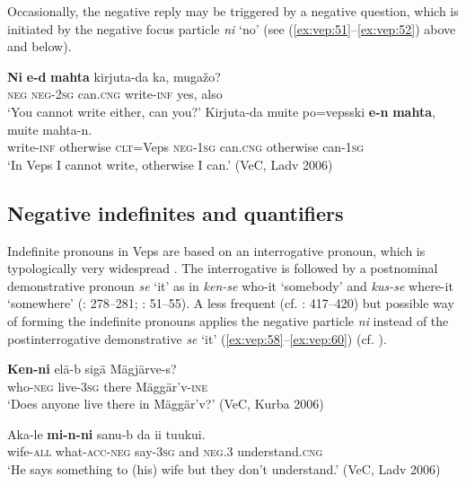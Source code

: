 \documentclass[output=paper,colorlinks=true, citecolor=brown]{langscibook}
\begin{document}
Occasionally, the negative reply may be triggered by a negative question, which is initiated by the negative focus particle \textit{ni} ‘no’  (see (\ref{ex:vep:51}–\ref{ex:vep:52}) above and  below). 

\ea\label{ex:vep:57}
    \begin{xlist}[Q: ]
    \label{ex:vep:57A}
        \gll \textbf{Ni} \textbf{e-d} \textbf{mahta} kirjuta{}-da ka, mugažo? \\ 
              \textsc{neg} \textsc{neg{}-2sg} can.\textsc{cng} write\textsc{{}-inf} yes, also\\ 
        \glt ‘You cannot write either, can you?’
    \label{ex:vep:57B}
        \gll  Kirjuta-da muite po=vepsski \textbf{e-n} \textbf{mahta}, muite mahta{}-n.\\ 
               write\textsc{{}-inf} otherwise \textsc{clt}{}=Veps \textsc{neg-1sg} can.\textsc{cng} otherwise can-\textsc{1sg}\\
        \glt ‘In Veps I cannot write, otherwise I can.’ (VeC, Ladv 2006)
    \end{xlist}
\z 

\subsection{Negative indefinites and quantifiers}\label{sec:vep:3.2}

Indefinite pronouns in Veps are based on an interrogative pronoun, which is typologically very widespread \citep{Haspelmath2013-wals46}. The interrogative is followed by a postnominal demonstrative pronoun \textit{se} ‘it’ as in \textit{ken-se} who-it ‘somebody’ and \textit{kus-se} where-it ‘somewhere’ (\citealt{Grünthal2015}: 278–281; \citealt{Hienonen2010, Karjalainen2016}: 51–55). A less frequent (cf. \citealt{MSFOu86}: 417–420) but possible way of forming the indefinite pronouns applies the negative particle \textit{ni} instead of the postinterrogative demonstrative \textit{se} ‘it’ (\ref{ex:vep:58}–\ref{ex:vep:60}) (cf. \citealt{Yurayong2020}).

\ea
    \label{ex:vep:58}
    \gll  \textbf{Ken-ni}  elä{}-b sigä Mägjärve-s?\\
         who-\textsc{neg} live-\textsc{3sg} there Mäggär’v{}-\textsc{ine}\\
    \glt ‘Does anyone live there in Mäggär’v?’ (VeC, Kurba 2006)
\z

\ea\label{ex:vep:59}
    \gll Aka{}-le \textbf{mi{}-n-ni} sanu{}-b da ii tuukui.\\
         wife{}-\textsc{all} what-\textsc{acc}{}-\textsc{neg} say-\textsc{3sg} and \textsc{neg.3} understand.\textsc{cng}\\
    \glt ‘He says something to (his) wife but they don’t understand.’ (VeC, Ladv 2006)
\z
\end{document}
